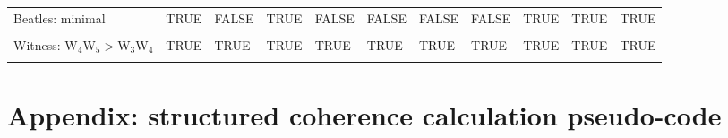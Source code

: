 \documentclass[
  10pt,
]{scrartcl}
\begin{document}
\begin{table}[H]
{\begin{tabular}[t]{lllllllllll}
Beatles: minimal & TRUE & FALSE & TRUE & FALSE & FALSE & FALSE & FALSE & TRUE & TRUE & TRUE\\
\cellcolor{gray!6}{Witness: W$_1$W$_2>$W$_3$W$_4$} & \cellcolor{gray!6}{TRUE} & \cellcolor{gray!6}{TRUE} & \cellcolor{gray!6}{TRUE} & \cellcolor{gray!6}{TRUE} & \cellcolor{gray!6}{TRUE} & \cellcolor{gray!6}{TRUE} & \cellcolor{gray!6}{TRUE} & \cellcolor{gray!6}{TRUE} & \cellcolor{gray!6}{TRUE} & \cellcolor{gray!6}{TRUE}\\
Witness: W$_4$W$_5>$W$_3$W$_4$ & TRUE & TRUE & TRUE & TRUE & TRUE & TRUE & TRUE & TRUE & TRUE & TRUE\\
\cellcolor{gray!6}{Success rate} & \cellcolor{gray!6}{50\%} & \cellcolor{gray!6}{50\%} & \cellcolor{gray!6}{67\%} & \cellcolor{gray!6}{50\%} & \cellcolor{gray!6}{50\%} & \cellcolor{gray!6}{67\%} & \cellcolor{gray!6}{67\%} & \cellcolor{gray!6}{100\%} & \cellcolor{gray!6}{92\%} & \cellcolor{gray!6}{100\%}\\
\bottomrule
\end{tabular}}
\end{table}

\hypertarget{appendix-structured-coherence-calculation-pseudo-code}{%
\section{Appendix: structured coherence calculation pseudo-code}\label{appendix-structured-coherence-calculation-pseudo-code}}
\end{document}
